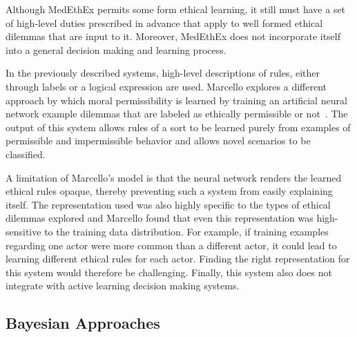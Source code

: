 \documentclass[11pt]{article}
\newcommand\jmnote[1]{\textcolor{red}{James: #1}}
\begin{document}
Although MedEthEx permits some form ethical learning, it still must have a set of high-level duties prescribed in advance that apply to well formed ethical dilemmas that are input to it. Moreover, MedEthEx does not incorporate itself into a general decision making and learning process.

In the previously described systems, high-level descriptions of rules, either through labels or a logical expression are used. Marcello explores a different approach by which moral permissibility is learned by training an artificial neural network example dilemmas that are labeled as ethically permissible or not~. The output of this system allows rules of a sort to be learned purely from examples of permissible and impermissible behavior and allows novel scenarios to be classified. 

A limitation of Marcello's model is that the neural network renders the learned ethical rules opaque, thereby preventing such a system from easily explaining itself. The representation used was also highly specific to the types of ethical dilemmas explored and Marcello found that even this representation was high-sensitive to the training data distribution. For example, if training examples regarding one actor were more common than a different actor, it could lead to learning different ethical rules for each actor. Finding the right representation for this system would therefore be challenging. Finally, this system also does not integrate with active learning decision making systems. 




\subsection{Bayesian Approaches}
\end{document}
